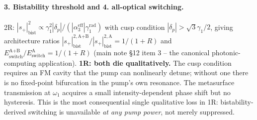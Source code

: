 \documentclass[11pt,a4paper]{article}
\begin{document}
\paragraph{3. Bistability threshold and 4. all-optical switching.}
2R: $|s_+|^{2}_\text{bist}\propto\gamma_1^{2}|\delta_p|/(|\alpha_3^\text{eff}|\gamma_1^\text{rad})$
with cusp condition $|\delta_p|>\sqrt{3}\gamma_1/2$, giving architecture
ratios $|s_+|^{2,\text{A+B}}_\text{bist}/|s_+|^{2,\text{A}}_\text{bist}=1/(1+R)$
and $E_\text{switch}^\text{A+B}/E_\text{switch}^\text{A}=1/(1+R)$
(main note \S 12 item 3 -- the canonical photonic-computing application).
\textbf{1R: both die qualitatively.}  The cusp condition requires an FM
cavity that the pump can nonlinearly detune; without one there is no
fixed-point bifurcation in the pump's own resonance.  The metasurface
transmission at $\omega_1$ acquires a small intensity-dependent phase
shift but no hysteresis.  This is the most consequential single
qualitative loss in 1R: bistability-derived switching is unavailable
\emph{at any pump power}, not merely suppressed.
\end{document}
